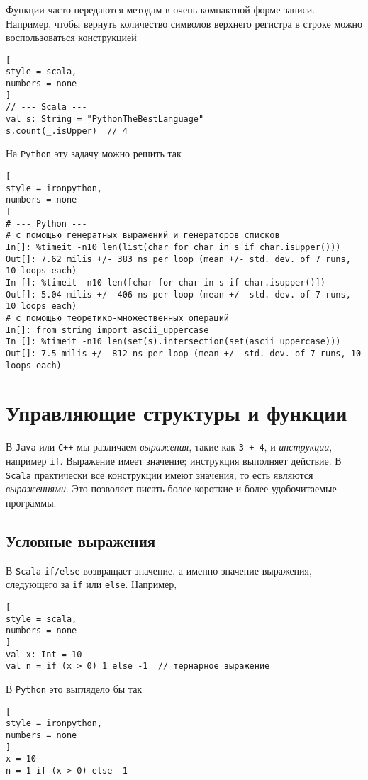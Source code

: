 \documentclass[%
	11pt,
	a4paper,
	utf8,
		]{article}
\begin{document}
Функции часто передаются методам в очень компактной форме записи. Например, чтобы вернуть количество символов верхнего регистра в строке можно воспользоваться конструкцией
\begin{lstlisting}[
style = scala,
numbers = none
]
// --- Scala ---
val s: String = "PythonTheBestLanguage"
s.count(_.isUpper)  // 4
\end{lstlisting}

На \texttt{Python} эту задачу можно решить так
\begin{lstlisting}[
style = ironpython,
numbers = none
]
# --- Python ---
# с помощью генератных выражений и генераторов списков
In[]: %timeit -n10 len(list(char for char in s if char.isupper()))
Out[]: 7.62 milis +/- 383 ns per loop (mean +/- std. dev. of 7 runs, 10 loops each)
In []: %timeit -n10 len([char for char in s if char.isupper()])
Out[]: 5.04 milis +/- 406 ns per loop (mean +/- std. dev. of 7 runs, 10 loops each)
# с помощью теоретико-множественных операций
In[]: from string import ascii_uppercase
In []: %timeit -n10 len(set(s).intersection(set(ascii_uppercase)))
Out[]: 7.5 milis +/- 812 ns per loop (mean +/- std. dev. of 7 runs, 10 loops each)
\end{lstlisting}

\section{Управляющие структуры и функции}

В \texttt{Java} или \texttt{C++} мы различаем \emph{выражения}, такие как \texttt{3 + 4}, и \emph{инструкции}, например \texttt{if}. Выражение имеет значение; инструкция выполняет действие. В \texttt{Scala} практически все конструкции имеют значения, то есть являются \emph{выражениями}. Это позволяет писать более короткие и более удобочитаемые программы.

\subsection{Условные выражения}

В \texttt{Scala} \verb|if/else| возвращает значение, а именно значение выражения, следующего за \texttt{if} или \texttt{else}. Например,
\begin{lstlisting}[
style = scala,
numbers = none
]
val x: Int = 10
val n = if (x > 0) 1 else -1  // тернарное выражение
\end{lstlisting}

В \texttt{Python} это выглядело бы так
\begin{lstlisting}[
style = ironpython,
numbers = none
]
x = 10
n = 1 if (x > 0) else -1
\end{lstlisting}
\end{document}
